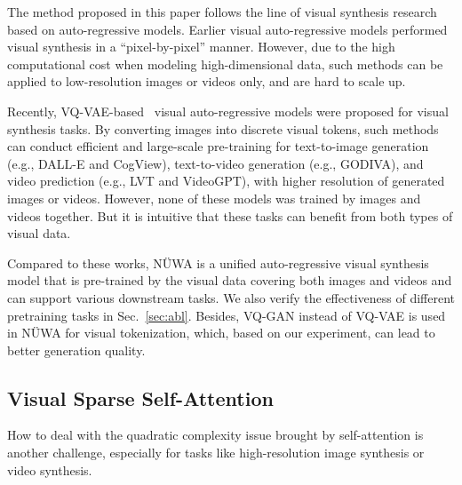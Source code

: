 The method proposed in this paper follows the line of visual synthesis research based on auto-regressive models. Earlier visual auto-regressive models \cite{oordConditionalImageGeneration2016, vanoordPixelRecurrentNeural2016, parmarImageTransformer2018, chenGenerativepretrainingPixels2020, weissenbornScalingAutoregressiveVideo2020} performed visual synthesis in a ``pixel-by-pixel'' manner. However, due to the high computational cost when modeling high-dimensional data, such methods can be applied to low-resolution images or videos only, and are hard to scale up.

Recently, VQ-VAE-based~\cite{oordNeuralDiscreteRepresentation2017} visual auto-regressive models were proposed for visual synthesis tasks. By converting images into discrete visual tokens, such methods can conduct efficient and large-scale pre-training for text-to-image generation (e.g., DALL-E\cite{rameshZeroShotTexttoImageGeneration2021} and CogView\cite{dingCogViewMasteringTexttoImage2021}), text-to-video generation (e.g., GODIVA\cite{wuGODIVAGeneratingOpenDomaIn2021}), and video prediction (e.g., LVT\cite{rakhimovLatentVideoTransformer2020} and VideoGPT\cite{yanVideoGPTVideoGeneration2021}), with higher resolution of generated images or videos. However, none of these models was trained by images and videos together. But it is intuitive that these tasks can benefit from both types of visual data. 

Compared to these works, NÜWA is a unified auto-regressive visual synthesis model that is pre-trained by the visual data covering both images and videos and can support various downstream tasks. We also verify the effectiveness of different pretraining tasks in Sec.~\ref{sec:abl}. Besides, VQ-GAN\cite{esserTamingTransformersHighResolution2021} instead of VQ-VAE is used in NÜWA for visual tokenization, which, based on our experiment, can lead to better generation quality.

\subsection{Visual Sparse Self-Attention}

How to deal with the quadratic complexity issue brought by self-attention is another challenge, especially for tasks like high-resolution image synthesis or video synthesis.

